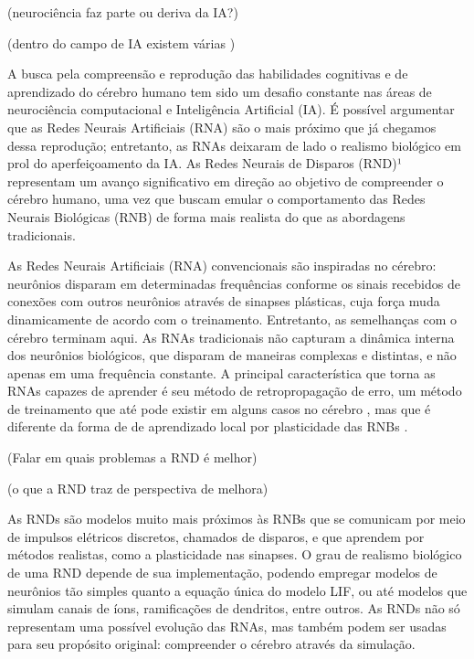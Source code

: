 (neurociência faz parte ou deriva da IA?)

(dentro do campo de IA existem várias )

A busca pela compreensão e reprodução das habilidades cognitivas e de aprendizado do cérebro humano tem sido um desafio constante nas áreas de neurociência computacional e
Inteligência Artificial (IA). É possível argumentar que as Redes Neurais Artificiais (RNA) são o mais próximo que já chegamos dessa reprodução; entretanto, as RNAs deixaram de lado
o realismo biológico em prol do aperfeiçoamento da IA. As Redes Neurais de Disparos (RND)¹ representam um avanço significativo em direção ao objetivo de compreender o cérebro
humano, uma vez que buscam emular o comportamento das Redes Neurais Biológicas (RNB) de forma mais realista do que as abordagens tradicionais.

As Redes Neurais Artificiais (RNA) convencionais são inspiradas no cérebro: neurônios disparam em determinadas frequências conforme os sinais recebidos de conexões com outros
neurônios através de sinapses plásticas, cuja força muda dinamicamente de acordo com o treinamento. Entretanto, as semelhanças com o cérebro terminam aqui. As RNAs tradicionais não
capturam a dinâmica interna dos neurônios biológicos, que disparam de maneiras complexas e distintas, e não apenas em uma frequência constante. A principal característica que torna
as RNAs capazes de aprender é seu método de retropropagação de erro, um método de treinamento que até pode existir em alguns casos no cérebro
\cite{lillicrapBackpropagationBrain2020} \cite{songCanBrainBackpropagation2020}, mas que é diferente da forma de de aprendizado local por plasticidade das RNBs
\cite{yamazakiSpikingNeuralNetworks2022}.

(Falar em quais problemas a RND é melhor)

(o que a RND traz de perspectiva de melhora) 

As RNDs são modelos muito mais próximos às RNBs que se comunicam por meio de impulsos elétricos discretos, chamados de disparos, e que aprendem por métodos realistas, como a
plasticidade nas sinapses. O grau de realismo biológico de uma RND depende de sua implementação, podendo empregar modelos de neurônios tão simples quanto a equação única do modelo
LIF, ou até modelos que simulam canais de íons, ramificações de dendritos, entre outros. As RNDs não só representam uma possível evolução das RNAs, mas também podem ser usadas para
seu propósito original: compreender o cérebro através da simulação.

